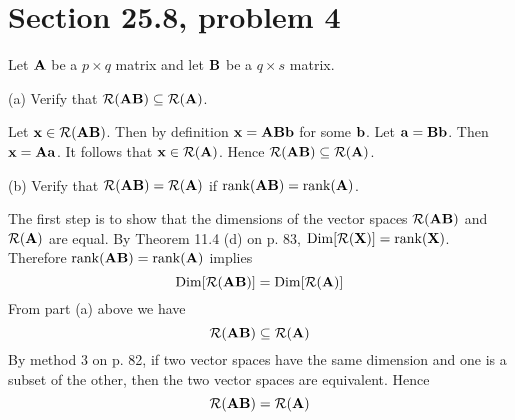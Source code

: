 \section{Section 25.8, problem 4}
Let $\bf A$ be a $p\times q$ matrix and let $\bf B$ be a $q\times s$
matrix.

\bigskip
\noindent
(a) Verify that ${\cal R}({\bf AB})\subseteq{\cal R}({\bf A})$.

\bigskip
\noindent
Let ${\bf x}\in{\cal R}({\bf AB})$.
Then by definition ${\bf x}={\bf ABb}$ for some $\bf b$.
Let ${\bf a}={\bf Bb}$.
Then ${\bf x}={\bf Aa}$.
It follows that ${\bf x}\in{\cal R}({\bf A})$.
Hence ${\cal R}({\bf AB})\subseteq{\cal R}({\bf A})$.

\bigskip
\noindent
(b) Verify that ${\cal R}({\bf AB})={\cal R}({\bf A})$
if $\mathop{\rm rank}({\bf AB})=\mathop{\rm rank}({\bf A})$.

\bigskip
\noindent
The first step is to show that the dimensions of the vector spaces
${\cal R}({\bf AB})$ and ${\cal R}({\bf A})$ are equal.
By Theorem 11.4 (d) on p. 83,
$\mathop{\rm Dim}[{\cal R}({\bf X})]=\mathop{\rm rank}({\bf X})$.
Therefore
$\mathop{\rm rank}({\bf AB})=\mathop{\rm rank}({\bf A})$
implies
$$\mathop{\rm Dim}[{\cal R}({\bf AB})]
=\mathop{\rm Dim}[{\cal R}({\bf A})]
$$
From part (a) above we have
$${\cal R}({\bf AB})\subseteq{\cal R}({\bf A})$$
By method 3 on p. 82, if two vector spaces have the same dimension
and one is a subset of the other, then the two vector spaces
are equivalent. Hence
$${\cal R}({\bf AB})={\cal R}({\bf A})$$
